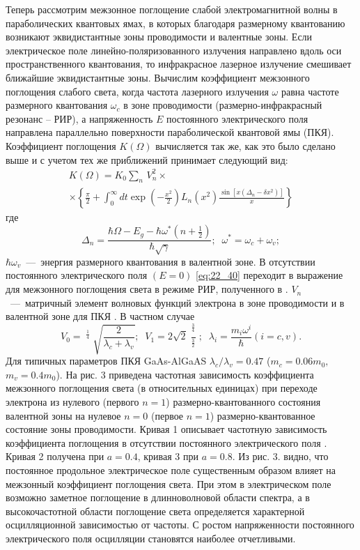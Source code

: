 {Теперь рассмотрим межзонное поглощение слабой электромагнитной волны в параболических квантовых ямах, в которых благодаря размерному квантованию возникают эквидистантные зоны проводимости и валентные зоны. Если электрическое поле линейно-поляризованного излучения направлено вдоль оси пространственного квантования, то инфракрасное лазерное излучение смешивает ближайшие эквидистантные зоны. Вычислим коэффициент межзонного поглощения слабого света, когда частота лазерного излучения $\omega $ равна частоте размерного квантования $\omega _{c} $ в зоне проводимости (размерно-инфракрасный резонанс -- РИР), а напряженность $E$ постоянного электрического поля направлена параллельно поверхности параболической квантовой ямы (ПКЯ). Коэффициент поглощения $K(\Omega )$ вычисляется так же, как это было сделано выше и с учетом тех же приближений принимает следующий вид: 
\begin{multline} \label{eq:22_40} 
K(\Omega )=K_{0} \sum _{n} \, V_{n}^{2} \times  \\
\times \left\{\frac{\pi }{2} +\int _{0}^{\infty } dt \exp \left(-\frac{x^{2} }{2} \right)L_{n} \left(x^{2} \right)\frac{\sin \left[x\left(\Delta _{n} -\delta x^{2} \right)\right]}{x} \right\}
\end{multline} 
где 
\[\Delta _{n} =\frac{\hbar \Omega -E_{g} -\hbar \omega ^{*} \left(n+{\tfrac{1}{2}} \right)}{\hbar \sqrt{\gamma } } ;\; \; \omega ^{*} =\omega _{c} +\omega _{v} ;\] 
$\hbar \omega _{v} $~---~энергия размерного квантования в валентной зоне. В отсутствии постоянного электрического поля $(E=0)$ \eqref{eq:22_40} переходит в выражение для межзонного поглощения света в режиме РИР, полученного в \cite{Sinyavskii2002}. $V_{n} $~---~матричный элемент волновых функций электрона в зоне проводимости и в валентной зоне для ПКЯ \cite{Sinyavskii2002}. В частном случае 
\[V_{0} =\mathop{\left(\lambda _{c} \lambda _{v} \right)}\nolimits^{{\tfrac{1}{4}} } \sqrt{\frac{2}{\lambda _{c} +\lambda _{v} } } ;\; \; V_{1} =2\sqrt{2} \frac{\mathop{\left(\lambda _{c} \lambda _{v} \right)}\nolimits^{{\tfrac{3}{4}} } }{\mathop{\left(\lambda _{c} +\lambda _{v} \right)}\nolimits^{{\tfrac{3}{2}} } } ;\; \; \lambda _{i} =\frac{m_{i} \omega ^{i} }{\hbar } (i=c,v).\] 
Для типичных параметров ПКЯ GaAs-AlGaAS $\lambda _{c} /\lambda _{v} =0.47$ ($m_{c} =0.06m_{0} ,$ $m_{v} =0.4m_{0} $). На рис. 3 приведена частотная зависимость коэффициента межзонного поглощения света (в относительных единицах) при переходе электрона из нулевого (первого $n=1$) размерно-квантованного состояния валентной зоны на нулевое $n=0$ (первое $n=1$) размерно-квантованное состояние зоны проводимости. Кривая 1 описывает частотную зависимость коэффициента поглощения в отсутствии постоянного электрического поля \cite{Sinyavskii2002}. Кривая 2 получена при $a=0.4$, кривая 3 при $a=0.8$. Из рис. 3. видно, что постоянное продольное электрическое поле существенным образом влияет на межзонный коэффициент поглощения света. При этом в электрическом поле возможно заметное поглощение в длинноволновой области спектра, а в высокочастотной области поглощение света определяется характерной осцилляционной зависимостью от частоты. С ростом напряженности постоянного электрического поля осцилляции становятся наиболее отчетливыми. 
}
